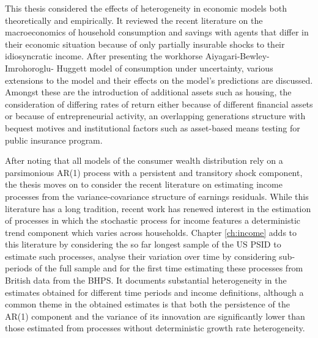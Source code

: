 This thesis considered the effects of heterogeneity in economic models both 
theoretically and empirically. It reviewed the recent literature on the 
macroeconomics of household consumption and savings with agents that differ in 
their economic situation because of only partially insurable shocks to their
idiosyncratic income. After presenting the workhorse Aiyagari-Bewley-Imrohoroglu-
Huggett model of consumption under uncertainty, various extensions to the model
and their effects on the model's predictions are discussed. Amongst these are
the introduction of additional assets such as housing, the consideration of 
differing rates of return either because of different financial assets or because
of entrepreneurial activity, an overlapping generations structure with bequest
motives and institutional factors such as asset-based means testing for public
insurance program. 

After noting that all models of the consumer wealth distribution rely on a 
parsimonious AR(1) process with a persistent and transitory shock component, 
the thesis moves on to consider the recent literature on estimating income 
processes from the variance-covariance structure of earnings residuals. While
this literature has a long tradition, recent work has renewed interest in the 
estimation of processes in which the stochastic process for income features
a deterministic trend component which varies across households. Chapter 
\ref{ch:income} adds to this literature by considering the so far longest sample
of the US PSID to estimate such processes, analyse their variation over time 
by considering sub-periods of the full sample and for the first time estimating
these processes from British data from the BHPS. It documents substantial 
heterogeneity in the estimates obtained for different time periods and income
definitions, although a common theme in the obtained estimates is that both the 
persistence of the AR(1) component and the variance of its innovation are
significantly lower than those estimated
from processes without deterministic growth rate heterogeneity. 

